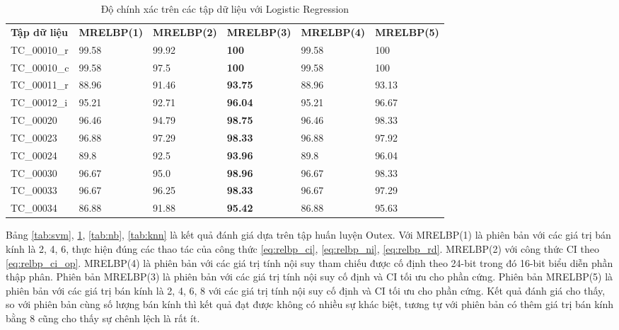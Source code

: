 \begin{table}[!ht]
	\centering
	\renewcommand{\arraystretch}{1.3}
	\caption{Độ chính xác trên các tập dữ liệu với Logistic Regression}
	\begin{tabular}{|p{2.5cm} p{2.5cm} p{2.5cm} p{2.5cm} p{2.5cm} p{2.5cm}|}
		\hline
		\rowcolor{gray!30}
		\textbf{Tập dữ liệu} & \textbf{MRELBP(1)}  & \textbf{MRELBP(2)} & \textbf{MRELBP(3) } &  \textbf{MRELBP(4)} & \textbf{MRELBP(5)}  \\
		TC\_00010\_r & 99.58 & 99.92 & \textbf{100} & 99.58 & 100
		\\ \hline
		TC\_00010\_c & 99.58 &97.5 & \textbf{100} & 99.58 & 100
		\\ \hline
		TC\_00011\_r & 88.96 &91.46 & \textbf{93.75} & 88.96 & 93.13
		\\ \hline
		TC\_00012\_i & 95.21 &92.71 & \textbf{96.04} & 95.21 & 96.67
		\\ \hline
		TC\_00020 & 96.46 & 94.79 & \textbf{98.75} & 96.46 & 98.33
		\\ \hline
		TC\_00023 & 96.88 & 97.29 & \textbf{98.33} & 96.88 & 97.92
		\\ \hline
		TC\_00024 & 89.8 & 92.5 & \textbf{93.96} & 89.8 & 96.04
		\\ \hline
		TC\_00030 & 96.67 & 95.0 & \textbf{98.96} & 96.67 & 98.33
		\\ \hline
		TC\_00033 & 96.67 &96.25 & \textbf{98.33} & 96.67 & 97.29
		\\ \hline
		TC\_00034 & 86.88 & 91.88 & \textbf{95.42} & 86.88 & 95.63
		\\ \hline
	\end{tabular}
	
	\label{tab:lr}
\end{table}

Bảng \ref{tab:svm}, \ref{tab:lr}, \ref{tab:nb}, \ref{tab:knn} là kết quả đánh giá dựa trên tập huấn luyện Outex. Với MRELBP(1) là phiên bản với các giá trị bán kính là 2, 4, 6, thực hiện đúng các thao tác của công thức \ref{eq:relbp_ci}, \ref{eq:relbp_ni}, \ref{eq:relbp_rd}. MRELBP(2) với công thức CI theo \ref{eq:relbp_ci_op}. MRELBP(4) là phiên bản với các giá trị tính nội suy tham chiếu được cố định theo 24-bit trong đó 16-bit biểu diễn phần thập phân. Phiên bản MRELBP(3) là phiên bản với các giá trị tính nội suy cố định và CI tối ưu cho phần cứng. Phiên bản MRELBP(5) là phiên bản với các giá trị bán kính là 2, 4, 6, 8 với các giá trị tính nội suy cố định và CI tối ưu cho phần cứng. Kết quả đánh giá cho thấy, so với phiên bản cùng số lượng bán kính thì kết quả đạt được không có nhiều sự khác biệt, tương tự với phiên bản có thêm giá trị bán kính bằng 8 cũng cho thấy sự chênh lệch là rất ít. 

